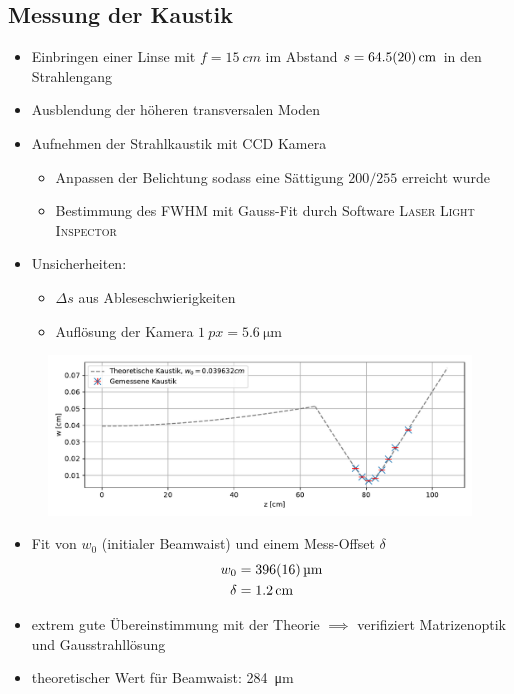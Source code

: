 \documentclass[10pt, aspectratio=169]{beamer}
\begin{document}
\subsection{Messung der Kaustik}
\begin{frame}
  \begin{itemize}
  \item<1-> Einbringen einer Linse mit \(f=\SI{15}{cm}\) im Abstand
    \(s=\SI{64.5\pm 2.0}{\centi\meter}\) in den Strahlengang
  \item<2-> Ausblendung der h\"oheren transversalen Moden
  \item<3-> Aufnehmen der Strahlkaustik mit CCD
    Kamera
    \begin{itemize}
    \item Anpassen der Belichtung sodass eine S\"attigung \(200/255\)
      erreicht wurde
    \item Bestimmung des FWHM mit Gauss-Fit durch Software
      \textsc{Laser Light Inspector} 
    \end{itemize}
  \item<4-> Unsicherheiten:
    \begin{itemize}
    \item \(\Delta s\) aus Ableseschwierigkeiten
    \item Aufl\"osung der Kamera \(\SI{1}{px}=\SI{5.6}{\micro\meter}\)
    \end{itemize}
  \end{itemize}
\end{frame}


\begin{frame}
  \begin{figure}[b]\centering
    \includegraphics[width=.8\columnwidth]{figs/kaustik.pdf}
  \end{figure}
  \begin{itemize}
  \item<1-> Fit von \(w_0\) (initialer Beamwaist) und einem
    Mess-Offset \(\delta\)
    \begin{align*}
      w_0 & =\SI{396\pm 16}{\micro\meter} \\
      \delta & =\SI{1.2}{cm}
    \end{align*}
  \item<2-> extrem gute \"Ubereinstimmung mit der Theorie \(\implies\)
    verifiziert Matrizenoptik und Gausstrahll\"osung
  \item<3-> theoretischer Wert f\"ur Beamwaist: \SI{284}{\micro\meter}
  \end{itemize}
\end{frame}
\end{document}
